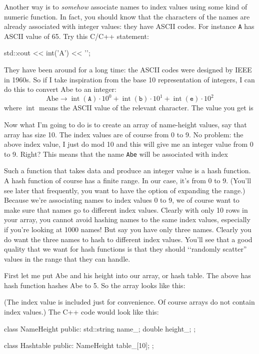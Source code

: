 Another way is to \textit{somehow} associate names to 
index values using some kind of numeric function.
In fact, you should know that the characters of the names
are already associated with integer values: they have ASCII codes.
For instance \verb!A! has ASCII value of 65.
Try this C/C++ statement:
\begin{console}
std::cout << int('A') << '\n';
\end{console}
They have been around for a long time: the ASCII codes were
designed by IEEE in 1960s.
So if I take inspiration from the base 10 representation of 
integers, 
I can do this to convert Abe to an integer:
\[
\text{Abe}
\rightarrow
\operatorname{int}(\texttt{A}) \cdot 10^0 +
\operatorname{int}(\texttt{b}) \cdot 10^1 +
\operatorname{int}(\texttt{e}) \cdot 10^2
\]
where $\operatorname{int}$ means the ASCII value of the relevant character.
The value you get is

Now what I'm going to do is to create an array of name-height values, say that
array has size 10.
The index values are of course from 0 to 9.
No problem: the above index value, I just do mod 10 and this will give me an integer
value from 0 to 9. Right?
This means that the name \verb!Abe! will be associated with index 


Such a function that takes data and produce an integer value 
is a hash function.
A hash function of course has a finite range.
In our case, it's from 0 to 9.
(You'll see later that frequently, you want to have the option of 
expanding the range.)
Because we're associating names to index values 0 to 9, we of course
want to make sure that names go to different index values.
Clearly with only 10 rows in your array, you cannot avoid 
hashing names to the same index values, especially if you're looking at 1000 names!
But say you have only three names.
Clearly you do want the three names to hash to different index values.
You'll see that a good quality that we want for hash functions
is that they should \lq\lq randomly scatter'' values in the range that they 
can handle. 

First let me put Abe and his height into our array, or hash table.
The above has hash function hashes Abe to 5.
So the array looks like this:



(The index value is included just for convenience. Of course arrays do not contain index values.)
The C++ code would look like this:
{\small
\begin{console}
class NameHeight
{
public:
    std::string name_;
    double height_;
};

class Hashtable
{
public:
    NameHeight table_[10];
};
\end{console}
}

